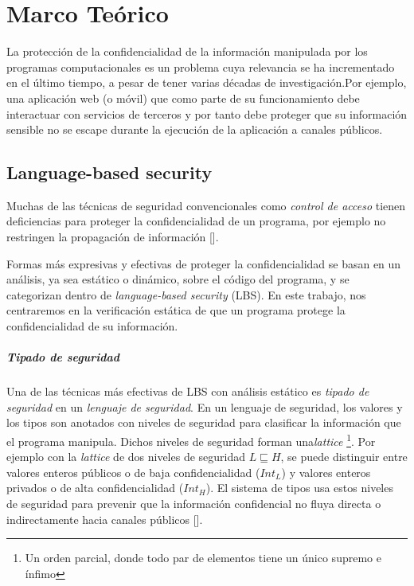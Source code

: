 \chapter{Marco Teórico}

	La protección de la confidencialidad de la información manipulada por los programas computacionales es un problema cuya relevancia se ha incrementado en el último tiempo, a pesar de tener varias décadas de investigación.Por ejemplo, una aplicación web (o móvil) que como parte de su funcionamiento debe interactuar con servicios de terceros y por tanto debe proteger que su información sensible no se escape durante la ejecución de la aplicación a canales públicos.

\section{Language-based security}

	Muchas de las técnicas de seguridad convencionales como \textit{control de acceso} tienen deficiencias para proteger la confidencialidad de un programa, por ejemplo no restringen la propagación de información []. %

	Formas más expresivas y efectivas de proteger la confidencialidad se basan en un análisis, ya sea estático o dinámico, sobre el código del programa, y se categorizan dentro de \textit{language-based security} (LBS). En este trabajo, nos centraremos en la verificación estática de que un programa protege la confidencialidad de su información.

	\paragraph{Tipado de seguridad}
	Una de las técnicas más efectivas de LBS con análisis estático es \textit{tipado de seguridad} en un \textit{lenguaje de seguridad}. En un lenguaje de seguridad, los valores y los tipos son anotados con niveles de seguridad para clasificar la información que el programa manipula. Dichos niveles de seguridad forman una\textit{lattice} \footnote{Un orden parcial, donde todo par de elementos tiene un único supremo e ínfimo}. Por ejemplo con la \textit{lattice} de dos niveles de seguridad $L \sqsubseteq H$, se puede distinguir entre valores enteros públicos o de baja confidencialidad ($Int_L$) y valores enteros privados o de alta confidencialidad ($Int_H$). El sistema de tipos usa estos niveles de seguridad para prevenir que la información confidencial no fluya directa o indirectamente hacia canales públicos []. %

